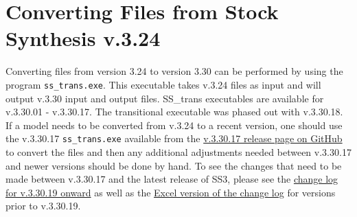 \hypertarget{ConvIssues}{}
\section{Converting Files from Stock Synthesis v.3.24}
Converting files from version 3.24 to version 3.30 can be performed by using the program \texttt{ss\_trans.exe}. This executable takes v.3.24 files as input and will output v.3.30 input and output files. SS\_trans executables are available for v.3.30.01 - v.3.30.17. The transitional executable was phased out with v.3.30.18. If a model needs to be converted from v.3.24 to a recent version, one should use the v.3.30.17 \texttt{ss\_trans.exe} available from the \href{https://github.com/nmfs-ost/ss3-source-code/releases/tag/v3.30.17}{v.3.30.17 release page on GitHub} to convert the files and then any additional adjustments needed between v.3.30.17 and newer versions should be done by hand.  To see the changes that need to be made between v.3.30.17 and the latest release of SS3, please see the \href{https://github.com/orgs/nmfs-ost/projects/11}{change log for v.3.30.19 onward} as well as the \href{https://github.com/nmfs-ost/ss3-source-code/blob/v3.30.19/Change_log_for_SS_3.30.xlsx?raw=true}{Excel version of the change log} for versions prior to v.3.30.19.


